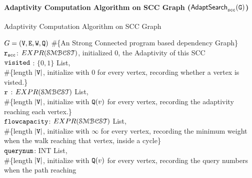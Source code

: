   \paragraph*{Adaptivity Computation Algorithm on SCC Graph ($\mathtt{\mathsf{AdaptSearch}_{scc}(G)}$)}
    \begin{algorithm}
            \caption{
            {Adaptivity Computation Algorithm on SCC Graph }
            \label{alg:adaptscc}
            }
            \begin{algorithmic}[1]
              \REQUIRE $G = (\mathtt{V}, \mathtt{E}, \mathtt{W}, \mathtt{Q})$ \#\{An Strong Connected program based dependency Graph\}
            \\
            $\mathtt{r_{scc}}$: $EXPR(\mathcal{SMBCST})$, initialized $0$, the Adaptivity of this SCC
            \STATE {} 
            \\ \qquad  $\mathtt{visited}$ : $\{0, 1\}$ List, 
            \\ \qquad  \#\{length $|\mathtt{V}|$, initialize with $0$ for every vertex, recording whether a vertex is visted.\}
            \\ \qquad  $\mathtt{r}$ : $EXPR(\mathcal{SMBCST})$ List, 
            \\ \qquad  \#\{length $|\mathtt{V}|$, initialize with $\mathtt{Q}(v)$ for every vertex, recording the adaptivity reaching each vertex.\}
            \\ \qquad  $\mathtt{flowcapacity}$: $EXPR(\mathcal{SMBCST})$ List, 
            \\ \qquad  \#\{length $|\mathtt{V}|$, initialize with $\infty$ for every vertex,
            recording the minimum weight when the walk reaching 
            that vertex, inside a cycle\}
            \\ \qquad  $\mathtt{querynum}$: INT List,
            \\ \qquad  \#\{length $|\mathtt{V}|$, initialize with $\mathtt{Q}(v)$ for every vertex, 
            recording the query numbers when the path reaching 

\end{algorithmic}
\end{algorithm}
